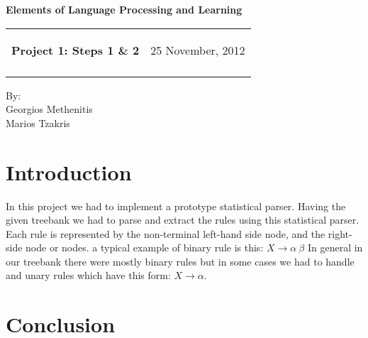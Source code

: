 \documentclass[a4paper,11pt]{article}
\makeatletter
\newcommand{\resheading}[1]{{\large \colorbox{mygrey}{\begin{minipage}{\textwidth}{\textbf{#1 \vphantom{p\^{E}}}}\end{minipage}}}}
\newcommand{\mywebheader}{
  \begin{tabular}{@{}p{5in}p{4in}}
  {\resheading{Project 1: Steps 1 \& 2}} & {\Large 25 November, 2012}\\\vspace{0.2cm}
  \end{tabular}}
\makeatother
\begin{document}
\begin{center}
{\LARGE \textbf{Elements of Language Processing and Learning}}\\ [1em]
\end{center}
\mywebheader

\begin{center}
{\Large By:} \\ \vspace{0.1cm}
{\Large Georgios Methenitis} \\ \vspace{0.1cm}
{\Large Marios Tzakris}
\end{center}


\section{Introduction}
In this project we had to implement a prototype statistical parser. Having the given treebank we had to parse and extract the rules using this statistical parser. Each rule is represented by the non-terminal left-hand side node, and the right-side node or nodes. a typical example of  binary rule is this:
$X \rightarrow \alpha\	 \beta$
In general in our treebank there were mostly binary rules but in some cases we had to handle and unary rules which have this form: $X \rightarrow \alpha$.


\section{Conclusion}
\end{document}
